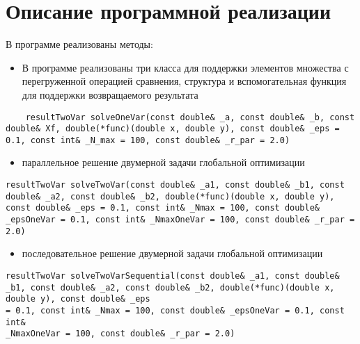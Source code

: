 \documentclass{report}
\begin{document}
\section*{Описание программной реализации}
В программе реализованы методы:
\begin{itemize}
\item В программе реализованы три класса для поддержки элементов множества с перегруженной операцией сравнения, структура и вспомогательная функция для поддержки возвращаемого результата

\end{itemize}
\begin{lstlisting}
	resultTwoVar solveOneVar(const double& _a, const double& _b, const double& Xf, double(*func)(double x, double y), const double& _eps = 0.1, const int& _N_max = 100, const double& _r_par = 2.0)
\end{lstlisting}
\begin{itemize}
\item параллельное решение двумерной задачи глобальной оптимизации

\end{itemize}
\begin{lstlisting}
resultTwoVar solveTwoVar(const double& _a1, const double& _b1, const double& _a2, const double& _b2, double(*func)(double x, double y), const double& _eps = 0.1, const int& _Nmax = 100, const double& _epsOneVar = 0.1, const int& _NmaxOneVar = 100, const double& _r_par = 2.0)
\end{lstlisting}
\begin{itemize}
\item последовательное решение двумерной задачи глобальной оптимизации
\end{itemize}
\begin{lstlisting}
resultTwoVar solveTwoVarSequential(const double& _a1, const double& _b1, const double& _a2, const double& _b2, double(*func)(double x, double y), const double& _eps
= 0.1, const int& _Nmax = 100, const double& _epsOneVar = 0.1, const int&
_NmaxOneVar = 100, const double& _r_par = 2.0) 

\end{lstlisting}

\newpage
\end{document}
